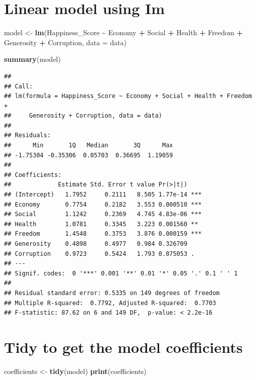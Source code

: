 \documentclass[
  11pt,
]{article}
\newenvironment{Shaded}{\begin{snugshade}}{\end{snugshade}}
\newcommand{\AttributeTok}[1]{\textcolor[rgb]{0.13,0.29,0.53}{#1}}
\newcommand{\FunctionTok}[1]{\textcolor[rgb]{0.13,0.29,0.53}{\textbf{#1}}}
\newcommand{\NormalTok}[1]{#1}
\newcommand{\OtherTok}[1]{\textcolor[rgb]{0.56,0.35,0.01}{#1}}
\newcommand{\SpecialCharTok}[1]{\textcolor[rgb]{0.81,0.36,0.00}{\textbf{#1}}}
\begin{document}
\section{Linear model using Im}\label{linear-model-using-im}

\begin{Shaded}
\begin{Highlighting}[]
\NormalTok{model }\OtherTok{\textless{}{-}} \FunctionTok{lm}\NormalTok{(Happiness\_Score }\SpecialCharTok{\textasciitilde{}}\NormalTok{ Economy }\SpecialCharTok{+}\NormalTok{ Social }\SpecialCharTok{+}\NormalTok{ Health }\SpecialCharTok{+}\NormalTok{ Freedom }\SpecialCharTok{+}\NormalTok{ Generosity}
            \SpecialCharTok{+}\NormalTok{ Corruption, }\AttributeTok{data =}\NormalTok{ data)}

\FunctionTok{summary}\NormalTok{(model)}
\end{Highlighting}
\end{Shaded}

\begin{verbatim}
## 
## Call:
## lm(formula = Happiness_Score ~ Economy + Social + Health + Freedom + 
##     Generosity + Corruption, data = data)
## 
## Residuals:
##      Min       1Q   Median       3Q      Max 
## -1.75304 -0.35306  0.05703  0.36695  1.19059 
## 
## Coefficients:
##             Estimate Std. Error t value Pr(>|t|)    
## (Intercept)   1.7952     0.2111   8.505 1.77e-14 ***
## Economy       0.7754     0.2182   3.553 0.000510 ***
## Social        1.1242     0.2369   4.745 4.83e-06 ***
## Health        1.0781     0.3345   3.223 0.001560 ** 
## Freedom       1.4548     0.3753   3.876 0.000159 ***
## Generosity    0.4898     0.4977   0.984 0.326709    
## Corruption    0.9723     0.5424   1.793 0.075053 .  
## ---
## Signif. codes:  0 '***' 0.001 '**' 0.01 '*' 0.05 '.' 0.1 ' ' 1
## 
## Residual standard error: 0.5335 on 149 degrees of freedom
## Multiple R-squared:  0.7792, Adjusted R-squared:  0.7703 
## F-statistic: 87.62 on 6 and 149 DF,  p-value: < 2.2e-16
\end{verbatim}

\section{Tidy to get the model
coefficients}\label{tidy-to-get-the-model-coefficients}

\begin{Shaded}
\begin{Highlighting}[]
\NormalTok{coefficients }\OtherTok{\textless{}{-}} \FunctionTok{tidy}\NormalTok{(model)}
\FunctionTok{print}\NormalTok{(coefficients)}
\end{Highlighting}
\end{Shaded}
\end{document}
